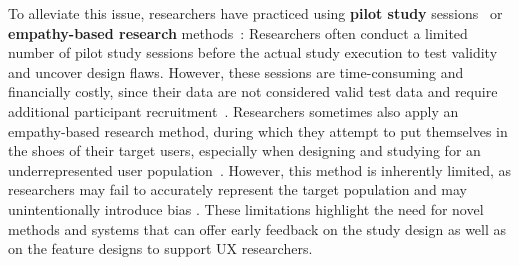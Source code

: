 \documentclass[manuscript,review,anonymous]{acmart}
\DeclareRobustCommand{\note}[1]{{\sethlcolor{orange!30!white}\hl{#1}}}
\begin{document}
To alleviate this issue, researchers have practiced using \textbf{pilot study} sessions~\cite{decker-maurerMethodMadnessUsability2012} or \textbf{empathy-based research} methods~\cite{sarkelaMethodEmpathyBasedStories2020}:
Researchers often conduct a limited number of pilot study sessions before the actual study execution to test validity and uncover design flaws. However, these sessions are time-consuming and financially costly, since their data are not considered valid test data and require additional participant recruitment~\cite{decker-maurerMethodMadnessUsability2012}.
Researchers sometimes also apply an empathy-based research method, during which they attempt to put themselves in the shoes of their target users, especially when designing and studying for an underrepresented user population~\cite{sarkelaMethodEmpathyBasedStories2020}.
However, this method is inherently limited, as researchers may fail to accurately represent the target population and may unintentionally introduce bias \cite{whartonApplyingCognitiveWalkthroughs1992}. 
These limitations highlight the need for novel methods and systems that can offer early feedback on the study design as well as on the feature designs to support UX researchers.


\end{document}
